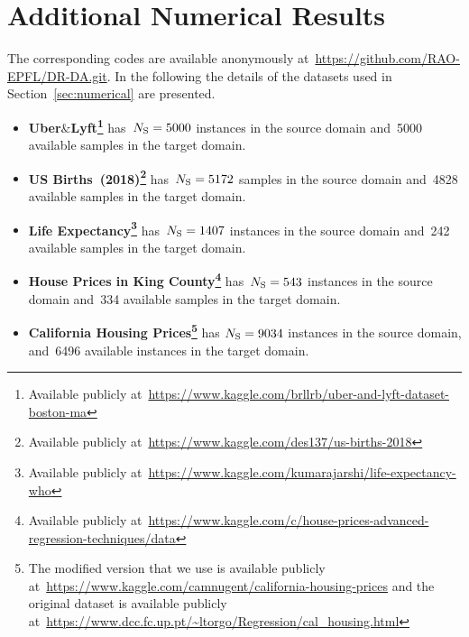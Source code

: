 \documentclass{article}
\begin{document}
\section{Additional Numerical Results}
The corresponding codes are available anonymously at~\url{https://github.com/RAO-EPFL/DR-DA.git}.
In the following the details of the datasets used in Section~\ref{sec:numerical} are presented.
    \begin{itemize}[leftmargin = 3mm]
      \item \textbf{Uber$\&$Lyft\footnote{Available publicly at~\url{https://www.kaggle.com/brllrb/uber-and-lyft-dataset-boston-ma}}} has~$N_{\rm S} = 5000$ instances in the source domain and~5000 available samples in the target domain. 
      \item \textbf{US Births~(2018)\footnote{Available publicly at~\url{https://www.kaggle.com/des137/us-births-2018}}} has~$N_{\rm S} = 5172$ samples in the source domain and~4828 available samples in the target domain.
       \item \textbf{Life Expectancy{\footnote{Available publicly at~\url{https://www.kaggle.com/kumarajarshi/life-expectancy-who}}}} has~$N_{\rm S} = 1407$ instances in the source domain and~242 available samples in the target domain.
     \item \textbf{House Prices in King County\footnote{Available publicly at~\url{https://www.kaggle.com/c/house-prices-advanced-regression-techniques/data}}} has~$N_{\rm S} = 543$ instances in the source domain and~334 available samples in the target domain.
         \item \textbf{California Housing Prices\footnote{The modified version that we use is available publicly at~\url{https://www.kaggle.com/camnugent/california-housing-prices} and the original dataset is available publicly at~\url{https://www.dcc.fc.up.pt/~ltorgo/Regression/cal_housing.html}}} has $N_{\rm S} = 9034$ instances in the source domain, and~6496 available instances in the target domain.
    \end{itemize}
\end{document}
